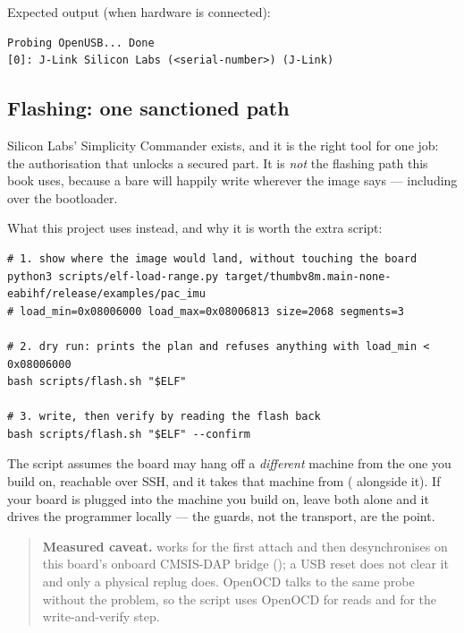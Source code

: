 Expected output (when hardware is connected):

\begin{verbatim}
Probing OpenUSB... Done
[0]: J-Link Silicon Labs (<serial-number>) (J-Link)
\end{verbatim}

\subsection{Flashing: one sanctioned path}
\label{subsec:install-silabs-tools}

Silicon Labs' Simplicity Commander exists, and it is the right tool for one job: the
authorisation that unlocks a secured part. It is \emph{not} the flashing path this book
uses, because a bare  will happily write wherever the image
says — including over the bootloader.

What this project uses instead, and why it is worth the extra script:

\begin{verbatim}
# 1. show where the image would land, without touching the board
python3 scripts/elf-load-range.py target/thumbv8m.main-none-eabihf/release/examples/pac_imu
# load_min=0x08006000 load_max=0x08006813 size=2068 segments=3

# 2. dry run: prints the plan and refuses anything with load_min < 0x08006000
bash scripts/flash.sh "$ELF"

# 3. write, then verify by reading the flash back
bash scripts/flash.sh "$ELF" --confirm
\end{verbatim}

The script assumes the board may hang off a \emph{different} machine from the one you
build on, reachable over SSH, and it takes that machine from 
( alongside it). If your board is plugged into the machine you build
on, leave both alone and it drives the programmer locally — the guards, not the transport,
are the point.

\begin{quote}
\textbf{Measured caveat.}  works for the first attach and then
desynchronises on this board's onboard CMSIS-DAP bridge
(); a USB
reset does not clear it and only a physical replug does. OpenOCD talks to the same probe
without the problem, so the script uses OpenOCD for reads and  for
the write-and-verify step.
\end{quote}

